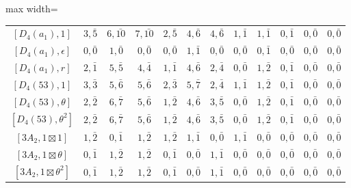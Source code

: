 \begin{table}[ht]
\begin{adjustbox}{max width=\linewidth}
\begin{tabular}{|c|ccccccccccc|}
        $[D_4(a_1), 1]$        & $3, \bar{5}$ & $6, \bar{10}$ & $7, \bar{10}$ & $2, \bar{5}$ & $4, \bar{6}$ & $4, \bar{6}$ & $1, \bar{1}$ & $1, \bar{1}$ & $0, \bar{1}$ & $0, \bar{0}$ & $0, \bar{0}$ \\ 
        $[D_4(a_1), \epsilon]$  & $0, \bar{0}$ & $1, \bar{0}$ & $0, \bar{0}$ & $0, \bar{0}$ & $1, \bar{1}$ & $0, \bar{0}$ & $0, \bar{0}$ & $0, \bar{1}$ & $0, \bar{0}$ & $0, \bar{0}$ & $0, \bar{0}$ \\ 
        $[D_4(a_1), r]$        & $2, \bar{1}$ & $5, \bar{5}$ & $4, \bar{4}$ & $1, \bar{1}$ & $4, \bar{6}$ & $2, \bar{4}$ & $0, \bar{0}$ & $1, \bar{2}$ & $0, \bar{1}$ & $0, \bar{0}$ & $0, \bar{0}$ \\ 
        $[D_4(53), 1]$         & $3, \bar{3}$ & $5, \bar{6}$ & $5, \bar{6}$ & $2, \bar{3}$ & $5, \bar{7}$ & $2, \bar{4}$ & $1, \bar{1}$ & $1, \bar{2}$ & $0, \bar{1}$ & $0, \bar{0}$ & $0, \bar{0}$ \\ 
        $[D_4(53), \theta]$    & $2, \bar{2}$ & $6, \bar{7}$ & $5, \bar{6}$ & $1, \bar{2}$ & $4, \bar{6}$ & $3, \bar{5}$ & $0, \bar{0}$ & $1, \bar{2}$ & $0, \bar{1}$ & $0, \bar{0}$ & $0, \bar{0}$ \\ 
        $[D_4(53), \theta^2]$  & $2, \bar{2}$ & $6, \bar{7}$ & $5, \bar{6}$ & $1, \bar{2}$ & $4, \bar{6}$ & $3, \bar{5}$ & $0, \bar{0}$ & $1, \bar{2}$ & $0, \bar{1}$ & $0, \bar{0}$ & $0, \bar{0}$ \\ 
        $[3A_2, 1\boxtimes1]$            & $1, \bar{2}$ & $0, \bar{1}$ & $1, \bar{2}$ & $1, \bar{2}$ & $1, \bar{1}$ & $0, \bar{0}$ & $1, \bar{1}$ & $0, \bar{0}$ & $0, \bar{0}$ & $0, \bar{0}$ & $0, \bar{0}$ \\ 
        $[3A_2, 1\boxtimes\theta]$       & $0, \bar{1}$ & $1, \bar{2}$ & $1, \bar{2}$ & $0, \bar{1}$ & $0, \bar{0}$ & $1, \bar{1}$ & $0, \bar{0}$ & $0, \bar{0}$ & $0, \bar{0}$ & $0, \bar{0}$ & $0, \bar{0}$ \\ 
        $[3A_2, 1\boxtimes\theta^2]$     & $0, \bar{1}$ & $1, \bar{2}$ & $1, \bar{2}$ & $0, \bar{1}$ & $0, \bar{0}$ & $1, \bar{1}$ & $0, \bar{0}$ & $0, \bar{0}$ & $0, \bar{0}$ & $0, \bar{0}$ & $0, \bar{0}$ \\ \hline


\end{tabular}
\end{adjustbox}
\end{table}
